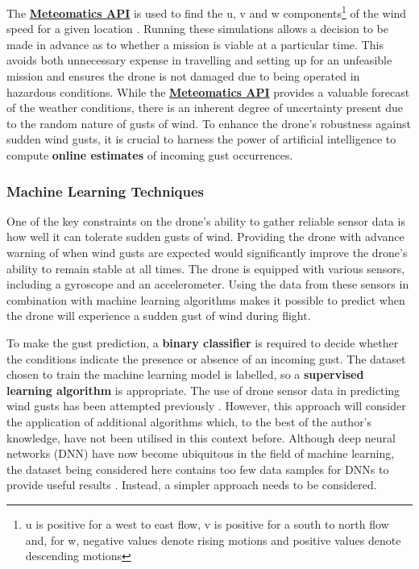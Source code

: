 The \href{https://www.meteomatics.com/}{\textbf{Meteomatics API}}  is used to find the u, v and w components\footnote{u is positive for a west to east flow, v is positive for a south to north flow and, for w, negative values denote rising motions and positive values denote descending motions} of the wind speed for a given location \cite{meteomatics_wind_speed}. Running these simulations allows a decision to be made in advance as to whether a mission is viable at a particular time. This avoids both unnecessary expense in travelling and setting up for an unfeasible mission and ensures the drone is not damaged due to being operated in hazardous conditions. While the \href{https://www.meteomatics.com/}{\textbf{Meteomatics API}}
provides a valuable forecast of the weather conditions, there is an inherent degree of uncertainty present due to the random nature of gusts of wind. To enhance the drone's robustness against sudden wind gusts, it is crucial to harness the power of artificial intelligence to compute \textbf{online estimates} of incoming gust occurrences. 

\subsubsection{Machine Learning Techniques}
\label{sec:mlalgos}

One of the key constraints on the drone's ability to gather reliable sensor data is how well it can tolerate sudden gusts of wind. Providing the drone with advance warning of when wind gusts are expected would significantly improve the drone's ability to remain stable at all times. The drone is equipped with various sensors, including a gyroscope and an accelerometer. Using the data from these sensors in combination with machine learning algorithms makes it possible to predict when the drone will experience a sudden gust of wind during flight.

To make the gust prediction, a \textbf{binary classifier} is required to decide whether the conditions indicate the presence or absence of an incoming gust. The dataset chosen to train the machine learning model is labelled, so a \textbf{supervised learning algorithm} is appropriate. The use of drone sensor data in predicting wind gusts has been attempted previously \cite{gu2018wind}. However, this approach will consider the application of additional algorithms which, to the best of the author's knowledge, have not been utilised in this context before. Although deep neural networks (DNN) have now become ubiquitous in the field of machine learning, the dataset being considered here contains too few data samples for DNNs to provide useful results \cite{golestaneh2024samplesneededtraindeep}. Instead, a simpler approach needs to be considered. 

